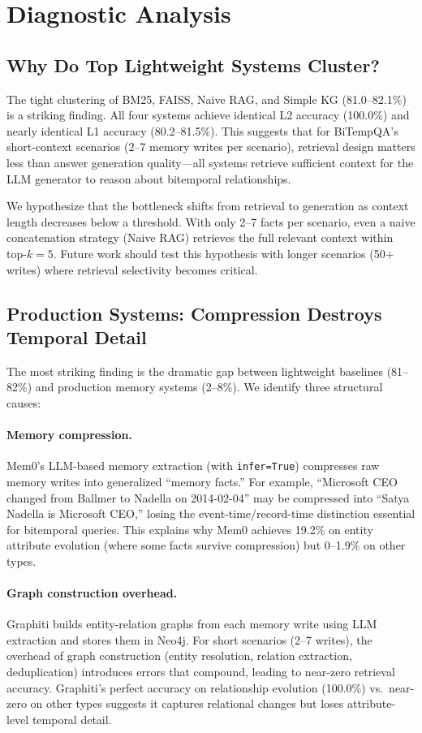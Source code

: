 \section{Diagnostic Analysis}

\subsection{Why Do Top Lightweight Systems Cluster?}
The tight clustering of BM25, FAISS, Naive RAG, and Simple KG (81.0--82.1\%) is a striking finding.
All four systems achieve identical L2 accuracy (100.0\%) and nearly identical L1 accuracy (80.2--81.5\%).
This suggests that for BiTempQA's short-context scenarios (2--7 memory writes per scenario), retrieval design matters less than answer generation quality---all systems retrieve sufficient context for the LLM generator to reason about bitemporal relationships.

We hypothesize that the bottleneck shifts from retrieval to generation as context length decreases below a threshold.
With only 2--7 facts per scenario, even a naive concatenation strategy (Naive RAG) retrieves the full relevant context within top-$k{=}5$.
Future work should test this hypothesis with longer scenarios (50+ writes) where retrieval selectivity becomes critical.

\subsection{Production Systems: Compression Destroys Temporal Detail}
The most striking finding is the dramatic gap between lightweight baselines (81--82\%) and production memory systems (2--8\%).
We identify three structural causes:

\paragraph{Memory compression.}
Mem0's LLM-based memory extraction (with \texttt{infer=True}) compresses raw memory writes into generalized ``memory facts.''
For example, ``Microsoft CEO changed from Ballmer to Nadella on 2014-02-04'' may be compressed into ``Satya Nadella is Microsoft CEO,'' losing the event-time/record-time distinction essential for bitemporal queries.
This explains why Mem0 achieves 19.2\% on entity attribute evolution (where some facts survive compression) but 0--1.9\% on other types.

\paragraph{Graph construction overhead.}
Graphiti builds entity-relation graphs from each memory write using LLM extraction and stores them in Neo4j.
For short scenarios (2--7 writes), the overhead of graph construction (entity resolution, relation extraction, deduplication) introduces errors that compound, leading to near-zero retrieval accuracy.
Graphiti's perfect accuracy on relationship evolution (100.0\%) vs.\ near-zero on other types suggests it captures relational changes but loses attribute-level temporal detail.

